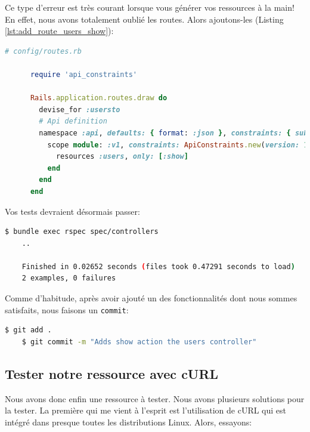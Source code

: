 \documentclass[]{report}
\begin{document}
    Ce type d'erreur est très courant lorsque vous générer vos ressources à la main! En effet, nous avons totalement oublié les routes. Alors ajoutons-les (Listing \ref{lst:add_route_users_show}):

    \begin{scriptsize}
      \begin{lstlisting}[language=ruby, caption={Ajoute de la route Users\#Show}, label={lst:add_route_users_show}]
      # config/routes.rb

      require 'api_constraints'

      Rails.application.routes.draw do
        devise_for :usersto
        # Api definition
        namespace :api, defaults: { format: :json }, constraints: { subdomain: 'api' }, path: '/' do
          scope module: :v1, constraints: ApiConstraints.new(version: 1, default: true) do
            resources :users, only: [:show]
          end
        end
      end
      \end{lstlisting}
    \end{scriptsize}


    Vos tests devraient désormais passer:

    \begin{scriptsize}
    \begin{lstlisting}[language=bash]
    $ bundle exec rspec spec/controllers
    ..

    Finished in 0.02652 seconds (files took 0.47291 seconds to load)
    2 examples, 0 failures
    \end{lstlisting}
    \end{scriptsize}

    Comme d'habitude, après avoir ajouté un des fonctionnalités dont nous sommes satisfaits, nous faisons un \verb|commit|:

    \begin{scriptsize}
    \begin{lstlisting}[language=bash]
    $ git add .
    $ git commit -m "Adds show action the users controller"
    \end{lstlisting}
    \end{scriptsize}

    \subsection{Tester notre ressource avec cURL}

      Nous avons donc enfin une ressource à tester. Nous avons plusieurs solutions pour la tester. La première qui me vient à l'esprit est l'utilisation de cURL qui est intégré dans presque toutes les distributions Linux. Alors, essayons:
\end{document}
